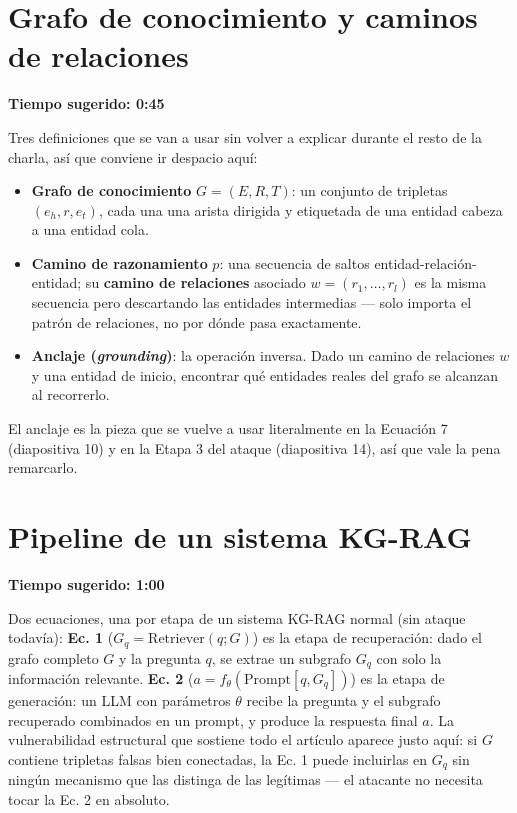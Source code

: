 \documentclass[11pt]{article}
\newcommand{\tiempo}[1]{{\small\color{timecolor}\textbf{Tiempo sugerido: #1}}\par\vspace{0.3em}}
\begin{document}
\section{Grafo de conocimiento y caminos de relaciones}
\tiempo{0:45}
Tres definiciones que se van a usar sin volver a explicar durante el resto de la charla,
así que conviene ir despacio aquí:
\begin{itemize}
  \item \textbf{Grafo de conocimiento} $G=(E,R,T)$: un conjunto de tripletas
    $(e_h, r, e_t)$, cada una una arista dirigida y etiquetada de una entidad cabeza a una
    entidad cola.
  \item \textbf{Camino de razonamiento} $p$: una secuencia de saltos entidad-relación-entidad;
    su \textbf{camino de relaciones} asociado $w=(r_1,\dots,r_l)$ es la misma secuencia pero
    descartando las entidades intermedias --- solo importa el patrón de relaciones, no por
    dónde pasa exactamente.
  \item \textbf{Anclaje (\emph{grounding})}: la operación inversa. Dado un camino de
    relaciones $w$ y una entidad de inicio, encontrar qué entidades reales del grafo se
    alcanzan al recorrerlo.
\end{itemize}
El anclaje es la pieza que se vuelve a usar literalmente en la Ecuación 7 (diapositiva 10) y
en la Etapa 3 del ataque (diapositiva 14), así que vale la pena remarcarlo.

\section{Pipeline de un sistema KG-RAG}
\tiempo{1:00}
Dos ecuaciones, una por etapa de un sistema KG-RAG normal (sin ataque todavía):
\textbf{Ec. 1} ($G_q = \text{Retriever}(q; G)$) es la etapa de recuperación: dado el grafo
completo $G$ y la pregunta $q$, se extrae un subgrafo $G_q$ con solo la información
relevante. \textbf{Ec. 2} ($a = f_\theta(\text{Prompt}[q, G_q])$) es la etapa de
generación: un LLM con parámetros $\theta$ recibe la pregunta y el subgrafo recuperado
combinados en un prompt, y produce la respuesta final $a$. La vulnerabilidad estructural
que sostiene todo el artículo aparece justo aquí: si $G$ contiene tripletas falsas bien
conectadas, la Ec. 1 puede incluirlas en $G_q$ sin ningún mecanismo que las distinga de las
legítimas --- el atacante no necesita tocar la Ec. 2 en absoluto.

\end{document}
